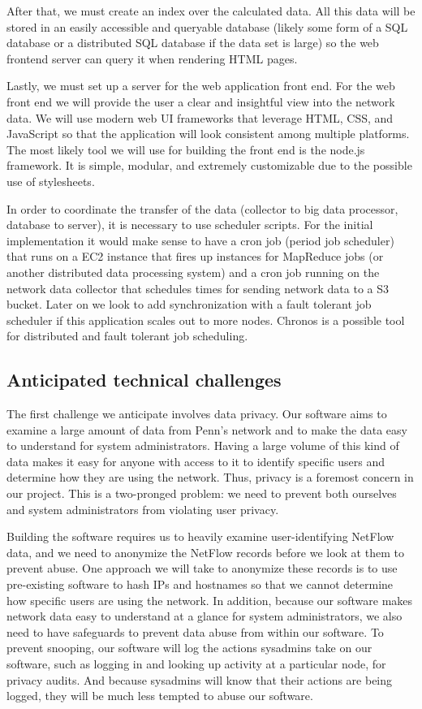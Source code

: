 \documentclass{sig-alternate}
\begin{document}
After that, we must create an index over the calculated data. All this data will
be stored in an easily accessible and queryable database (likely some form of a
SQL database or a distributed SQL database if the data set is large) so the web
frontend server can query it when rendering HTML pages.

Lastly, we must set up a server for the web application front end. For the web
front end we will provide the user a clear and insightful view into the network
data. We will use modern web UI frameworks that leverage HTML, CSS, and
JavaScript so that the application will look consistent among multiple
platforms. The most likely tool we will use for building the front end is the
node.js framework. It is simple, modular, and extremely customizable due to the
possible use of stylesheets.

In order to coordinate the transfer of the data (collector to big data
processor, database to server), it is necessary to use scheduler scripts. For
the initial implementation it would make sense to have a cron job (period job
scheduler) that runs on a EC2 instance that fires up instances for MapReduce
jobs (or another distributed data processing system) and a cron job running on
the network data collector that schedules times for sending network data to a S3
bucket. Later on we look to add synchronization with a fault tolerant job
scheduler if this application scales out to more nodes. Chronos is a possible
tool for distributed and fault tolerant job scheduling.\cite{AirbnbChronos}

\subsection{Anticipated technical challenges}

The first challenge we anticipate involves data privacy. Our software aims to
examine a large amount of data from Penn's network and to make the data easy to
understand for system administrators. Having a large volume of this kind of data
makes it easy for anyone with access to it to identify specific users and
determine how they are using the network. Thus, privacy is a foremost concern in
our project. This is a two-pronged problem: we need to prevent both ourselves
and system administrators from violating user privacy.

Building the software requires us to heavily examine user-identifying NetFlow
data, and we need to anonymize the NetFlow records before we look at them to
prevent abuse. One approach we will take to anonymize these records is to use
pre-existing software to hash IPs and hostnames so that we cannot determine how
specific users are using the network. In addition, because our software makes
network data easy to understand at a glance for system administrators, we also
need to have safeguards to prevent data abuse from within our software. To
prevent snooping, our software will log the actions sysadmins take on our
software, such as logging in and looking up activity at a particular node, for
privacy audits. And because sysadmins will know that their actions are being
logged, they will be much less tempted to abuse our software.
\end{document}

